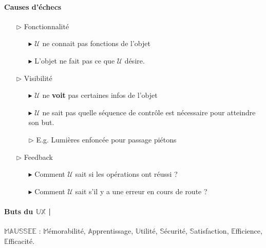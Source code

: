 \documentclass[2pt]{report}
\begin{document}
\begin{multicols*}{3}
    \paragraph{Causes d'échecs}
    \begin{itemize}
        \item[$\rhd$] Fonctionnalité 
            \begin{itemize}
                \item[$\blacktriangleright$] $\mathcal{U}$ ne connait pas fonctions de l'objet
                \item[$\blacktriangleright$] L'objet ne fait pas ce que  
                    $\mathcal{U}$ désire. 
            \end{itemize}
        \item[$\rhd$] Visibilité 
            \begin{itemize}
                \item[$\blacktriangleright$] $\mathcal{U}$ ne \textbf{voit} 
                    pas certaines infos de l'objet   
                \item[$\blacktriangleright$] 
                    $\mathcal{U}$ ne sait pas quelle séquence de contrôle est nécessaire pour 
                    atteindre son but.  
                \item[$\rhd$] E.g. Lumières enfoncée pour passage piétons
            \end{itemize}
        \item[$\rhd$] Feedback 
            \begin{itemize}
                \item[$\blacktriangleright$] Comment $\mathcal{U}$ 
                    sait si les opérations ont réussi ?
                \item[$\blacktriangleright$] 
                    Comment $\mathcal{U}$ 
                    sait s'il y a une erreur en cours de route ?
            \end{itemize}
    \end{itemize}

    \paragraph{Buts du $\mathbb{UX}$ | }
    $\mathbb{MAUSSEE}$ : $\mathbb{M}$émorabilité, 
    $\mathbb{A}$pprentissage, $\mathbb{U}$tilité,
    $\mathbb{S}$écurité, $\mathbb{S}$atisfaction, 
    $\mathbb{E}$fficience, $\mathbb{E}$fficacité. 


\end{multicols*}
\end{document}
